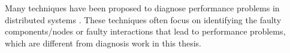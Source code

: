 Many techniques have been proposed to diagnose 
performance problems in distributed systems
\citep{SambasivanNSDI,Fonseca2010,Kasick2010,XuSOSP2009}.
These techniques often focus on identifying the faulty components/nodes or 
faulty interactions that lead to performance problems, 
which are different from diagnosis work in this thesis.






